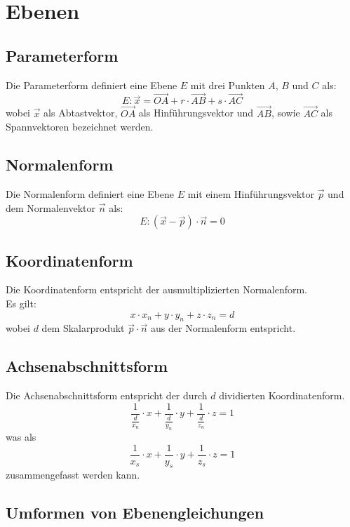 \documentclass[a4paper,12pt]{article}
\begin{document}
\section{Ebenen}
\subsection{Parameterform}
Die Parameterform definiert eine Ebene $E$ mit drei Punkten $A$, $B$ und $C$ als:
$$E : \vec{x} = \vec{OA} + r \cdot \vec{AB} + s \cdot \vec{AC}$$
wobei $\vec{x}$ als Abtastvektor, $\vec{OA}$ als Hinführungsvektor und $\vec{AB}$, sowie $\vec{AC}$ als Spannvektoren bezeichnet werden.
\subsection{Normalenform}
Die Normalenform definiert eine Ebene $E$ mit einem Hinführungsvektor $\vec{p}$ und dem Normalenvektor $\vec{n}$ als:
$$E : (\vec{x} - \vec{p}) \cdot \vec{n} = 0$$
\subsection{Koordinatenform}
Die Koordinatenform entspricht der ausmultiplizierten Normalenform.\\
Es gilt:
$$x \cdot x_n + y \cdot y_n + z \cdot z_n = d$$
wobei $d$ dem Skalarprodukt $\vec{p} \cdot \vec{n}$ aus der Normalenform entspricht.
\subsection{Achsenabschnittsform}
Die Achsenabschnittsform entspricht der durch $d$ dividierten Koordinatenform.
$$\frac{1}{\frac{d}{x_n}} \cdot x + \frac{1}{\frac{d}{y_n}} \cdot y + \frac{1}{\frac{d}{z_n}} \cdot z = 1$$
was als 
$$\frac{1}{x_s} \cdot x + \frac{1}{y_s} \cdot y + \frac{1}{z_s} \cdot z = 1$$
zusammengefasst werden kann.
\subsection{Umformen von Ebenengleichungen}
\end{document}
